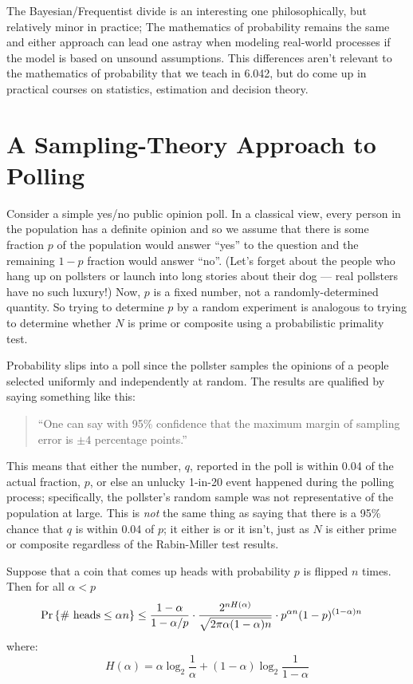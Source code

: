 \documentclass[12pt]{article}
\begin{document}
{The Bayesian/Frequentist divide is an interesting one philosophically, but relatively minor in practice; The mathematics of probability remains the same and either approach can lead one astray when modeling real-world processes if the model is based on unsound assumptions. This differences aren't relevant to the mathematics of probability that we teach in 6.042, but do come up in practical courses on statistics, estimation and decision theory.

\section*{A Sampling-Theory Approach to Polling}

Consider a simple yes/no public opinion poll. In a classical view, every person in the population has a definite opinion and so we assume that there is some fraction $p$ of the population would answer ``yes'' to the question and the remaining $1 - p$ fraction would answer ``no''.  (Let's forget about the people who hang up on pollsters or launch into long stories about their dog --- real pollsters have no such luxury!)  Now, $p$ is a fixed number, not a randomly-determined quantity.  So trying to determine $p$ by a random experiment is analogous to trying to determine whether $N$ is prime or composite using a probabilistic primality test.

Probability slips into a poll since the pollster samples the opinions of a people selected uniformly and independently at random.  The results are qualified by saying something like this:
%
\begin{quotation}
``One can say with 95\% confidence that the maximum margin of sampling
error is $\pm 4$ percentage points.''
\end{quotation}
%
This means that either the number, $q$, reported in the poll is within
0.04 of the actual fraction, $p$, or else an unlucky 1-in-20 event
happened during the polling process; specifically, the pollster's random
sample was not representative of the population at large.  This is
\textit{not} the same thing as saying that there is a 95\% chance that $q$
is within 0.04 of $p$; it either is or it isn't, just as $N$ is either
prime or composite regardless of the Rabin-Miller test results.

\newpage}



Suppose that a coin that comes up heads with probability $p$ is
flipped $n$ times.  Then for all $\alpha < p$
%
\begin{align*}
\mathop{\textup{Pr}}\nolimits\left\{\text{\# heads} \leq \alpha n\right\}
    & \leq \frac{1 - \alpha}{1 - \alpha / p} \cdot
           \frac{2^{n H(\alpha)}}{\sqrt{2 \pi \alpha (1 - \alpha) n}} 
           \cdot p^{\alpha n} (1-p)^{(1 - \alpha) n}
\end{align*}
%
where:
%
\[
H(\alpha) = \alpha \log_2 \frac{1}{\alpha} +
		(1 - \alpha) \log_2 \frac{1}{1 - \alpha}
\]
\end{document}
